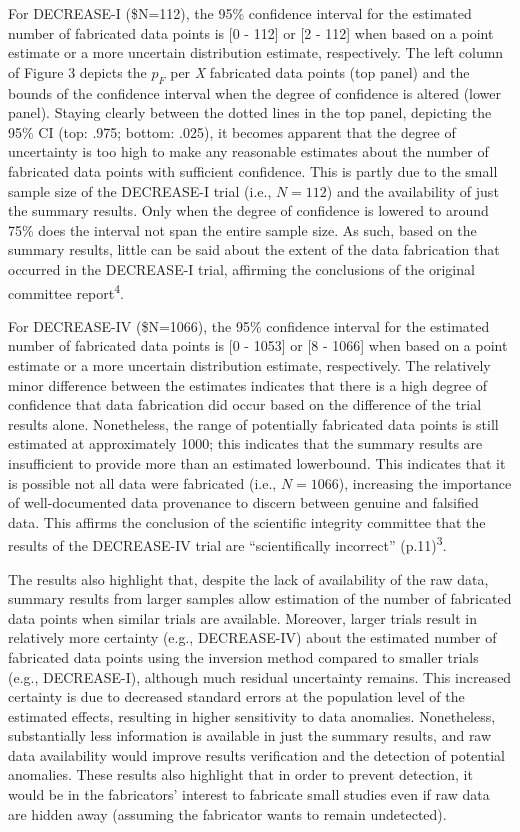 \documentclass[]{article}
\begin{document}
For DECREASE-I (\$N=112), the 95\% confidence interval for the estimated
number of fabricated data points is {[}0 - 112{]} or {[}2 - 112{]} when
based on a point estimate or a more uncertain distribution estimate,
respectively. The left column of Figure 3 depicts the \(p_F\) per
\emph{X} fabricated data points (top panel) and the bounds of the
confidence interval when the degree of confidence is altered (lower
panel). Staying clearly between the dotted lines in the top panel,
depicting the 95\% CI (top: .975; bottom: .025), it becomes apparent
that the degree of uncertainty is too high to make any reasonable
estimates about the number of fabricated data points with sufficient
confidence. This is partly due to the small sample size of the
DECREASE-I trial (i.e., \(N=112\)) and the availability of just the
summary results. Only when the degree of confidence is lowered to around
75\% does the interval not span the entire sample size. As such, based
on the summary results, little can be said about the extent of the data
fabrication that occurred in the DECREASE-I trial, affirming the
conclusions of the original committee report\textsuperscript{4}.

For DECREASE-IV (\$N=1066), the 95\% confidence interval for the
estimated number of fabricated data points is {[}0 - 1053{]} or {[}8 -
1066{]} when based on a point estimate or a more uncertain distribution
estimate, respectively. The relatively minor difference between the
estimates indicates that there is a high degree of confidence that data
fabrication did occur based on the difference of the trial results
alone. Nonetheless, the range of potentially fabricated data points is
still estimated at approximately 1000; this indicates that the summary
results are insufficient to provide more than an estimated lowerbound.
This indicates that it is possible not all data were fabricated (i.e.,
\(N=1066\)), increasing the importance of well-documented data
provenance to discern between genuine and falsified data. This affirms
the conclusion of the scientific integrity committee that the results of
the DECREASE-IV trial are ``scientifically incorrect''
(p.11)\textsuperscript{3}.

The results also highlight that, despite the lack of availability of the
raw data, summary results from larger samples allow estimation of the
number of fabricated data points when similar trials are available.
Moreover, larger trials result in relatively more certainty (e.g.,
DECREASE-IV) about the estimated number of fabricated data points using
the inversion method compared to smaller trials (e.g., DECREASE-I),
although much residual uncertainty remains. This increased certainty is
due to decreased standard errors at the population level of the
estimated effects, resulting in higher sensitivity to data anomalies.
Nonetheless, substantially less information is available in just the
summary results, and raw data availability would improve results
verification and the detection of potential anomalies. These results
also highlight that in order to prevent detection, it would be in the
fabricators' interest to fabricate small studies even if raw data are
hidden away (assuming the fabricator wants to remain undetected).
\end{document}
